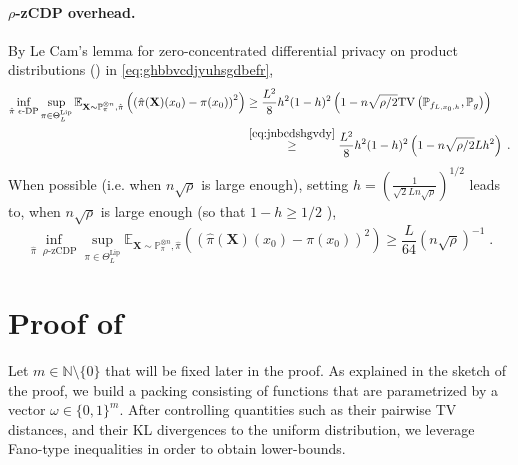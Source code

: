 \documentclass[10pt]{article} %
\newcommand{\N}[0]{\mathbb{N}}
\newcommand{\Prob}[0]{\mathbb{P}}
\newcommand{\E}[0]{\mathbb{E}}
\newcommand\vect[1]{\mathbf{#1}}
\newcommand\tv[2]{\mathrm{TV}\left( {#1}, {#2} \right)}
\newcommand\p[1]{\left( {#1}\right)}
\begin{document}
\paragraph{$\rho$-zCDP overhead.}
By Le Cam's lemma for zero-concentrated differential privacy on product distributions () in \eqref{eq:ghbbvcdjyuhsgdbefr},
\begin{equation*}
    \begin{aligned}
    \inf_{\hat{\pi} \text{ $\epsilon$-DP}} \sup_{\pi \in \Theta^{\text{Lip}}_L}
    \E_{\vect{X} \sim \Prob_{\pi}^{\otimes n}, \hat{\pi}}\p{\p{\hat{\pi}(\vect{X})(x_0) - \pi(x_0)}^2} 
    &\geq 
    \frac{L^2}{8} h^2 (1-h)^2
    \p{1 - n \sqrt{\rho/2}\tv{\Prob_{f_{L, x_0, h}}}{\Prob_{g}}}  \\
    &\stackrel{\eqref{eq:jnbcdshgvdy}}{\geq} 
    \frac{L^2}{8}h^2 (1-h)^2 %
    \p{1 - n \sqrt{\rho/2}Lh^2} \;.
    \end{aligned}
\end{equation*}
When possible (i.e. when $n \sqrt{\rho}$ is large enough), setting $h = \p{\frac{1}{\sqrt{2} L n \sqrt{\rho}}}^{1/2}$ leads to, when $n \sqrt{\rho}$ is large enough (so that $1-h \geq 1/2$ %
),
\begin{equation*}
    \inf_{\hat{\pi} \text{ $\rho$-zCDP}} \sup_{\pi \in \Theta^{\text{Lip}}_L}
    \E_{\vect{X} \sim \Prob_{\pi}^{\otimes n}, \hat{\pi}}\p{\p{\hat{\pi}(\vect{X})(x_0) - \pi(x_0)}^2} \geq \frac{L}{64} (n \sqrt{\rho})^{-1}
    \;.
\end{equation*}


\section{Proof of }
\label{proofofth:lidp}

    Let $m \in \N \setminus \{0\}$ that will be fixed later in the proof. 
    As explained in the sketch of the proof, we build a packing consisting of functions that are parametrized by a vector $\omega \in \{ 0, 1\}^m$. After controlling quantities such as their pairwise TV distances, and their KL divergences to the uniform distribution, we leverage Fano-type inequalities in order to obtain lower-bounds.
\end{document}
